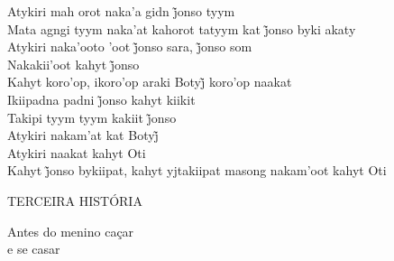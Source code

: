 \bigskip

\begin{linenumbers}\begingroup\raggedright
\noindent Atykiri mah orot naka’a gidn j̃onso tyym\\
Mata agngi tyym naka’at kahorot tatyym kat j̃onso byki akaty\\
Atykiri naka’ooto ’oot j̃onso sara, j̃onso som\\
Nakakii’oot kahyt j̃onso\\
Kahyt koro’op, ikoro’op araki Botyj̃ koro’op naakat\\
Ikiipadna padni j̃onso kahyt kiikit\\
Takipi tyym tyym kakiit j̃onso\\
Atykiri nakam’at kat Botyj̃\\
Atykiri naakat kahyt Oti\\
Kahyt j̃onso bykiipat, kahyt yjtakiipat masong nakam’oot kahyt Oti
\end{linenumbers}\endgroup


\blankpage
\pagebreak
\thispagestyle{empty}
\mbox{}
\begin{center}
\vspace{4cm}
{\formularlight\small TERCEIRA HISTÓRIA}

\medskip

{\formular\huge Antes do menino caçar\\\vspace{0.2cm} e se casar}
\end{center}
\pagebreak

